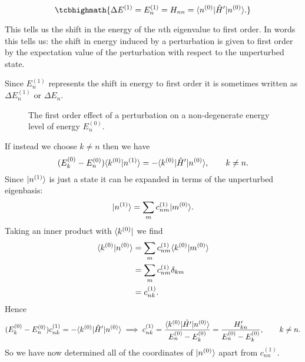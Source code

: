     \[
        \tcbhighmath{\Delta E^{(1)} = E_n^{(1)} = H_{nn} = \bra{n^{(0)}}\operator{H}'\ket{n^{(0)}}.}
    \]
    
    This tells us the shift in the energy of the \(n\)th eigenvalue to first order.
    In words this tells us: the shift in energy induced by a perturbation is given to first order by the expectation value of the perturbation with respect to the unperturbed state.
    
    Since \(E_n^{(1)}\) represents the shift in energy to first order it is sometimes written as \(\Delta E_n^{(1)}\) or \(\Delta E_n\).
    \begin{figure}[ht]
        \centering
        \caption{The first order effect of a perturbation on a non-degenerate energy level of energy \(E_n^{(0)}\).}
    \end{figure}
    If instead we choose \(k \ne n\) then we have
    \[(E_k^{(0)} - E_n^{(0)})\langle {k^{(0)}} \vert {n^{(1)}} \rangle = -\langle {k^{(0)}} \vert \hat{H}' \vert {n^{(0)}} \rangle, \qquad k\ne n.\]
    Since \(\vert {n^{(1)}} \rangle\) is just a state it can be expanded in terms of the unperturbed eigenbasis:
    \[\vert {n^{(1)}} \rangle = \sum_{m} c_{nm}^{(1)}\vert {m^{(0)}} \rangle.\]
    Taking an inner product with \(\langle {k^{(0)}} \vert\) we find
    \begin{align*}
        \langle {k^{(0)}} \vert {n^{(0)}} \rangle &= \sum_m c_{nm}^{(1)}\langle {k^{(0)}} \vert {m^{(0)}} \rangle\\
        &= \sum_{m} c_{nm}^{(1)}\delta_{km}\\
        &= c_{nk}^{(1)}.
    \end{align*}
    Hence
    \[(E_k^{(0)} - E_n^{(0)})c_{nk}^{(1)} = -\langle {k^{(0)}} \vert\hat{H}' \vert {n^{(0)}} \rangle \implies c_{nk}^{(1)} = \frac{\langle {k^{(0)}} \vert \hat{H'} \vert {n^{(0)}} \rangle}{E_n^{(0)} - E_k^{(0)}} = \frac{H'_{kn}}{E_n^{(0)} - E_k^{(0)}}, \qquad k \ne n.\]
    So we have now determined all of the coordinates of \(\vert {n^{(0)}} \rangle\) apart from \(c_{nn}^{(1)}\).
